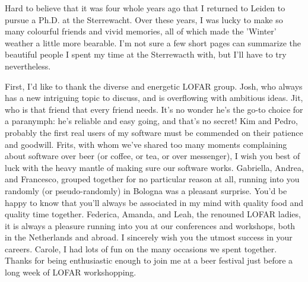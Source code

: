 \cleardoublepage
{}
{}
\begin{thesisacknowledgements}

    \newcommand{\bees}[1]{\texttt{[image: coloremoji.sty/emoji\_images/hires/\#1.pdf]}}

Hard to believe that it was four whole years ago that I returned to Leiden to pursue a Ph.D. at the Sterrewacht. Over these years, I was lucky to make so many colourful friends and vivid memories, all of which made the 'Winter' weather a little more bearable. I'm not sure a few short pages can summarize the beautiful people I spent my time at the Sterrewacth with, but I'll have to try nevertheless.

    First, I'd like to thank the diverse and energetic LOFAR group. Josh, who always has a new intriguing topic to discuss, and is overflowing with ambitious ideas. Jit, who is that friend that every friend needs. It's no wonder he's the go-to choice for a paranymph: he's reliable and easy going, and that's no secret! Kim and Pedro, probably the first real users of my software must be commended on their patience and goodwill. Frits, with whom we've shared too many moments complaining about software over beer (or coffee, or tea, or over messenger), I wish you best of luck with the heavy mantle of making sure our software works. Gabriella, Andrea, and Francesco, grouped together for no particular reason at all, running into you randomly (or pseudo-randomly) in Bologna was a pleasant surprise. You'd be happy to know that you'll always be associated in my mind with quality food and quality time together. Federica, Amanda, and Leah, the renouned LOFAR ladies, it is always a pleasure running into you at our conferences and workshops, both in the Netherlands and abroad. I sincerely wish you the utmost success in your careers. Carole, I had lots of fun on the many occasions we spent together. Thanks for being enthusiastic enough to join me at a beer festival just before a long week of LOFAR workshopping.


\end{thesisacknowledgements}
